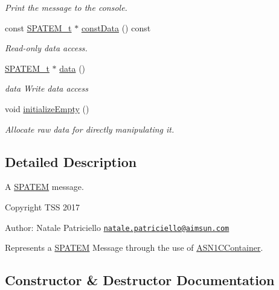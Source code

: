 \begin{DoxyCompactItemize}
\begin{DoxyCompactList}\small\item\em Print the message to the console. \end{DoxyCompactList}\item 
const \hyperlink{structSPATEM}{S\+P\+A\+T\+E\+M\+\_\+t} $\ast$ \hyperlink{classSPATEMMessage_afbb721337b41135e1316bc1fc99c37d5}{const\+Data} () const 
\begin{DoxyCompactList}\small\item\em Read-\/only data access. \end{DoxyCompactList}\item 
\hyperlink{structSPATEM}{S\+P\+A\+T\+E\+M\+\_\+t} $\ast$ \hyperlink{classSPATEMMessage_a43c27d472bbe0476d1a786078c492131}{data} ()
\begin{DoxyCompactList}\small\item\em data Write data access \end{DoxyCompactList}\item 
void \hyperlink{classSPATEMMessage_acec758fcc9c2eb8500ea03d8b772898a}{initialize\+Empty} ()\hypertarget{classSPATEMMessage_acec758fcc9c2eb8500ea03d8b772898a}{}\label{classSPATEMMessage_acec758fcc9c2eb8500ea03d8b772898a}

\begin{DoxyCompactList}\small\item\em Allocate raw data for directly manipulating it. \end{DoxyCompactList}\end{DoxyCompactItemize}


\subsection{Detailed Description}
A \hyperlink{structSPATEM}{S\+P\+A\+T\+EM} message. 

Copyright T\+SS 2017

Author\+: Natale Patriciello \href{mailto:natale.patriciello@aimsun.com}{\tt natale.\+patriciello@aimsun.\+com}

Represents a \hyperlink{structSPATEM}{S\+P\+A\+T\+EM} Message through the use of \hyperlink{classASN1CContainer}{A\+S\+N1\+C\+Container}. 

\subsection{Constructor \& Destructor Documentation}

